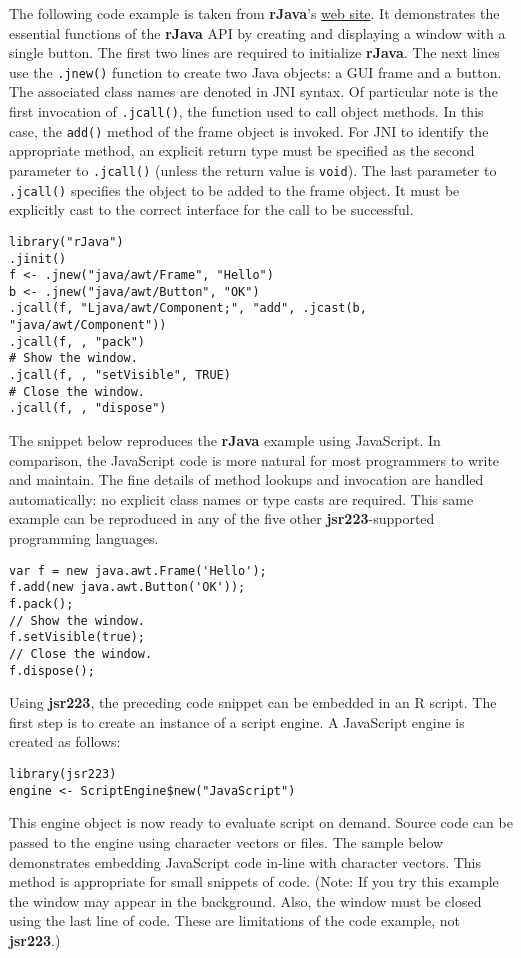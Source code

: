 The following code example is taken from \textbf{rJava}'s \href{http://www.rforge.net/rJava/}{web site}. It demonstrates the essential functions of the \textbf{rJava} API by creating and displaying a window with a single button. The first two lines are required to initialize \textbf{rJava}. The next lines use the \texttt{.jnew()} function to create two Java objects: a GUI frame and a button. The associated class names are denoted in JNI syntax. Of particular note is the first invocation of \texttt{.jcall()}, the function used to call object methods. In this case, the \texttt{add()} method of the frame object is invoked. For JNI to identify the appropriate method, an explicit return type must be specified as the second parameter to \texttt{.jcall()} (unless the return value is \texttt{void}). The last parameter to \texttt{.jcall()} specifies the object to be added to the frame object. It must be explicitly cast to the correct interface for the call to be successful.

\singlespace
\begin{verbatim}
library("rJava")
.jinit()
f <- .jnew("java/awt/Frame", "Hello")
b <- .jnew("java/awt/Button", "OK")
.jcall(f, "Ljava/awt/Component;", "add", .jcast(b, "java/awt/Component"))
.jcall(f, , "pack")
# Show the window.
.jcall(f, , "setVisible", TRUE)
# Close the window.
.jcall(f, , "dispose")
\end{verbatim}
\doublespace

The snippet below reproduces the \textbf{rJava} example using JavaScript. In comparison, the JavaScript code is more natural for most programmers to write and maintain. The fine details of method lookups and invocation are handled automatically: no explicit class names or type casts are required. This same example can be reproduced in any of the five other \textbf{jsr223}-supported programming languages.

\singlespace
\begin{verbatim}
var f = new java.awt.Frame('Hello');
f.add(new java.awt.Button('OK'));
f.pack();
// Show the window.
f.setVisible(true);
// Close the window.
f.dispose();
\end{verbatim}
\doublespace

Using \textbf{jsr223}, the preceding code snippet can be embedded in an R script. The first step is to create an instance of a script engine. A JavaScript engine is created as follows:

\singlespace
\begin{verbatim}
library(jsr223)
engine <- ScriptEngine$new("JavaScript")
\end{verbatim}
\doublespace
This engine object is now ready to evaluate script on demand. Source code can be passed to the engine using character vectors or files. The sample below demonstrates embedding JavaScript code in-line with character vectors. This method is appropriate for small snippets of code. (Note: If you try this example the window may appear in the background. Also, the window must be closed using the last line of code. These are limitations of the code example, not \textbf{jsr223}.)

